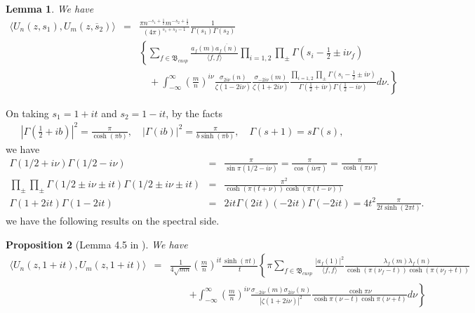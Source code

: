 \documentclass[11pt,reqno]{amsart}
\newcommand{\bna}{\begin{eqnarray*}}
\newcommand{\ena}{\end{eqnarray*}}
\newtheorem{lemma}{Lemma}[section]
\newtheorem{prop}[lemma]{Proposition}
\theoremstyle{definition}
\begin{document}
\begin{lemma}We have
\bna
\langle U_n(z,s_1),U_m(z,\overline s_2)\rangle
&=&\frac{\pi n^{-s_1+\frac{1}{2}}m^{-s_2+\frac{1}{2}}
}{(4\pi)^{s_1+s_2-1}}
\frac{1}{\Gamma(s_1)\Gamma(s_2)}\\
&&\left\{
\sum_{f\in\mathfrak B_{cusp}}\frac{a_f(m)\overline{a_f(n)}}{\langle f,f\rangle}
\prod_{i=1,2}\prod_{\pm}\Gamma(s_i-\frac{1}{2}\pm i\nu_f)\right.\\
&&\quad + \left.
\int_{-\infty}^\infty
\left(\frac{m}{n}\right)^{i\nu}\frac{\sigma_{2i\nu}(n)}{\zeta(1-2i\nu)}
\frac{\sigma_{-2i\nu}(m)}{\zeta(1+2i\nu)}
\frac{\prod_{i=1,2}\prod_{\pm}\Gamma(s_i-\frac{1}{2}\pm i\nu)}{\Gamma(\frac{1}{2}+i\nu)\Gamma(\frac{1}{2}-i\nu)}
d\nu.
\right\}
\ena
\end{lemma}

On taking $s_1=1+it$ and  $s_2=1-it$,
by the facts
\bna
|\Gamma(\frac{1}{2}+ib)|^2=\frac{\pi}{\cosh(\pi b)},\quad
|\Gamma(ib)|^2=\frac{\pi}{b\sinh(\pi b)},
\quad \Gamma(s+1)=s\Gamma(s),
\ena
we have
\bna
\Gamma(1/2+i\nu)\Gamma(1/2-i\nu)&=&
\frac{\pi}{\sin\pi(1/2-i\nu)}=\frac{\pi}{\cos(i\nu\pi)}
=\frac{\pi}{\cosh(\pi\nu)}\\
\prod_{\pm}\prod_{\pm}
\Gamma(1/2\pm i\nu\pm it)\Gamma(1/2\pm i\nu\pm it)
&=&\frac{\pi^2}{\cosh(\pi(t+\nu))
\cosh(\pi(t-\nu))}\\
\Gamma(1+2it)\Gamma(1-2it)
&=&2it\Gamma(2it) (-2it)\Gamma(-2it)=4t^2\frac{\pi}{2t\sinh(2\pi t)}.
\ena
we have the following results on the spectral side.
\begin{prop}[Lemma 4.5 in \cite{DeIw1982}]\label{prop-tr1-spectral}
We have
\bna
\langle U_n(z,1+it),U_m(z,1+it)\rangle
&=&
\frac{1}{4\sqrt{mn}}\left(\frac{m}{n}\right)^{it}
\frac{\sinh(\pi t)}{t}
\left\{\pi\sum_{f\in\mathfrak B_{cusp}}\frac{|a_f(1)|^2}{\langle f,f\rangle}
\frac{\lambda_{f}(m)\lambda_f(n)}{\cosh(\pi(\nu_f-t))\cosh(\pi(\nu_f+t))}\right.\\
&&\qquad
\left.+\int_{-\infty}^\infty
\left(\frac{m}{n}\right)^{i\nu}\frac{\sigma_{-2i\nu}(m)\sigma_{2i\nu}(n)}{|\zeta(1+2i\nu)|^2}
\frac{\cosh\pi\nu}{\cosh\pi(\nu-t)\cosh\pi(\nu+t)}d\nu
\right\}
\ena
\end{prop}
\end{document}
